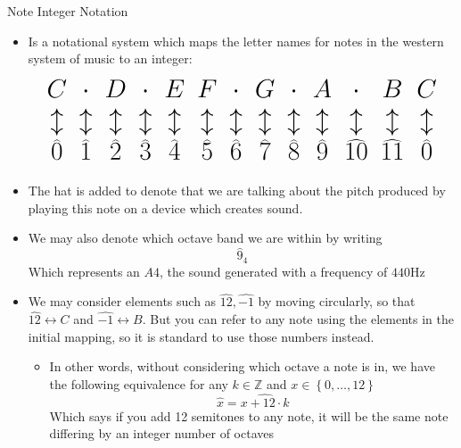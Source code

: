 \documentclass[preview]{standalone}
\begin{document}
\begin{defn*}{Note Integer Notation}
  \begin{itemize}
   \item Is a notational system which maps the letter names for notes in the western system of music to an integer: 
\[ 
  \huge
\begin{array}{ccccccccccccc}
    C& \cdot& D& \cdot& E& F& \cdot& G& \cdot& A& \cdot& B & C \\
    \updownarrow & \updownarrow & \updownarrow & \updownarrow & \updownarrow & \updownarrow & \updownarrow & \updownarrow & \updownarrow & \updownarrow & \updownarrow & \updownarrow & \updownarrow \\
    \widehat{0} & \widehat{1} & \widehat{2} & \widehat{3} & \widehat{4} & \widehat{5} & \widehat{6} & \widehat{7} & \widehat{8} & \widehat{9} & \widehat{10} & \widehat{11} & \widehat{0}\\
\end{array} 
\] 
    \item The hat is added to denote that we are talking about the pitch produced by playing this note on a device which creates sound.
    \item We may also denote which octave band we are within by writing 
      \[
      \widehat{9}_{4}
      \]
      Which represents an $A4$, the sound generated with a frequency of $440\text{Hz}$ 
    \item We may consider elements such as $ \widehat{12},  \widehat{-1}$ by moving circularly, so that $ \widehat{12} \leftrightarrow C$ and $ \widehat{-1} \leftrightarrow B$. But you can refer to any note using the elements in the initial mapping, so it is standard to use those numbers instead. 
      \begin{itemize}
        \item In other words, without considering which octave a note is in, we have the following equivalence for any $k \in \mathbb{Z}$ and $x \in \left\{ 0, \ldots, 12 \right\}$ 
        \[
        \widehat{x} = \widehat{x  +  12  \cdot k}
        \]
        Which says if you add 12 semitones to any note, it will be the same note differing by an integer number of octaves
      \end{itemize}
  \end{itemize}
\end{defn*}
\end{document}
